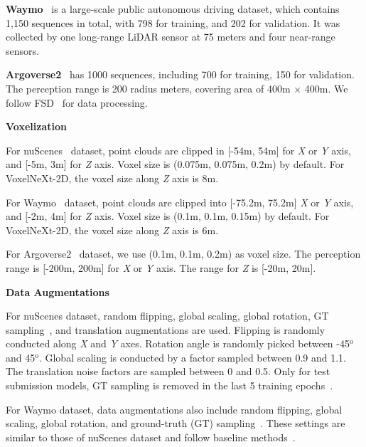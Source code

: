 \documentclass[10pt,twocolumn,letterpaper]{article}
\begin{document}
\vspace{0.5em}
\noindent
\textbf{Waymo}~\cite{waymo} is a large-scale public autonomous driving dataset, which contains 1,150 sequences in total, with 798 for training, and 202 for validation. It was collected by one long-range LiDAR sensor at 75 meters and four near-range sensors. 

\vspace{0.5em}
\noindent
\textbf{Argoverse2}~\cite{argo2} has 1000 sequences, including 700 for training, 150 for validation. The perception range is 200 radius meters, covering area of 400m × 400m. We follow FSD~\cite{fsd} for data processing.

\vspace{0.5em}
\noindent
\textbf{Voxelization}

For nuScenes~\cite{nuscenes} dataset, point clouds are clipped in [-54m, 54m] for {\em X} or {\em Y} axis, and [-5m, 3m] for {\em Z} axis. Voxel size is (0.075m, 0.075m, 0.2m) by default. For VoxelNeXt-2D, the voxel size along {\em Z} axis is 8m. 

For Waymo~\cite{waymo} dataset, point clouds are clipped into [-75.2m, 75.2m] {\em X} or {\em Y} axis, and [-2m, 4m] for {\em Z} axis. Voxel size is (0.1m, 0.1m, 0.15m) by default.  For VoxelNeXt-2D, the voxel size along {\em Z} axis is 6m. 

For Argoverse2~\cite{argo2} dataset, we use (0.1m, 0.1m, 0.2m) as voxel size. The perception range is [-200m, 200m] for {\em X} or {\em Y} axis. The range for {\em Z} is [-20m, 20m].

\vspace{0.5em}
\noindent
\textbf{Data Augmentations}

For nuScenes dataset, random flipping, global scaling, global rotation, GT sampling~\cite{second}, and  translation augmentations are used. Flipping is randomly conducted along {\em X} and {\em Y} axes. Rotation angle is randomly picked between -45$^{\mathrm{o}}$ and 45$^{\mathrm{o}}$. Global scaling is conducted by a factor sampled between 0.9 and 1.1. The translation noise factors are sampled between 0 and 0.5. Only for test submission models, GT sampling is removed in the last 5 training epochs~\cite{uvtr}. 

For Waymo dataset, data augmentations also include random flipping, global scaling, global rotation, and ground-truth (GT) sampling~\cite{second}. These settings are similar to those of nuScenes dataset and follow baseline methods~\cite{centerpoint,pvrcnn}.
\end{document}

